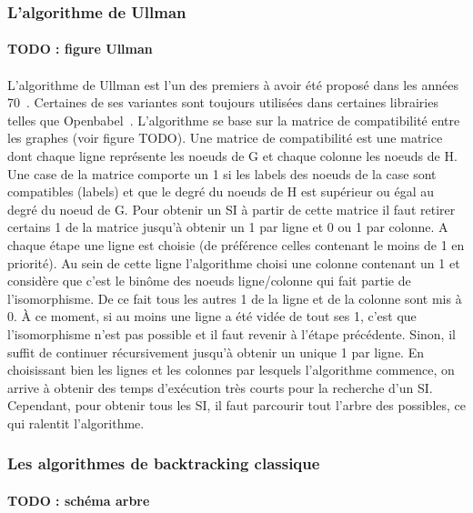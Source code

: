 \documentclass[12pt,french,twoside]{report}
\begin{document}
\subsubsection{L'algorithme de Ullman}

\paragraph{TODO : figure Ullman}

\paragraph{}L'algorithme de Ullman est l'un des premiers à avoir été proposé dans les années 70~\cite{ullmann_algorithm_1976}.
Certaines de ses variantes sont toujours utilisées dans certaines librairies telles que Openbabel~\cite{oboyle_open_2011}.
L'algorithme se base sur la matrice de compatibilité entre les graphes (voir figure TODO).
Une matrice de compatibilité est une matrice dont chaque ligne représente les noeuds de G et chaque colonne les noeuds de H.
Une case de la matrice comporte un 1 si les labels des noeuds de la case sont compatibles (labels) et que le degré du noeuds de H est supérieur ou égal au degré du noeud de G.
Pour obtenir un SI à partir de cette matrice il faut retirer certains 1 de la matrice jusqu'à obtenir un 1 par ligne et 0 ou 1 par colonne.
A chaque étape une ligne est choisie (de préférence celles contenant le moins de 1 en priorité).
Au sein de cette ligne l'algorithme choisi une colonne contenant un 1 et considère que c'est le binôme des noeuds ligne/colonne qui fait partie de l'isomorphisme.
De ce fait tous les autres 1 de la ligne et de la colonne sont mis à 0.
À ce moment, si au moins une ligne a été vidée de tout ses 1, c'est que l'isomorphisme n'est pas possible et il faut revenir à l'étape précédente.
Sinon, il suffit de continuer récursivement jusqu'à obtenir un unique 1 par ligne.
En choisissant bien les lignes et les colonnes par lesquels l'algorithme commence, on arrive à obtenir des temps d'exécution très courts pour la recherche d'un SI.
Cependant, pour obtenir tous les SI, il faut parcourir tout l'arbre des possibles, ce qui ralentit l'algorithme.


\subsubsection{Les algorithmes de backtracking classique}

\paragraph{TODO : schéma arbre}
\end{document}
